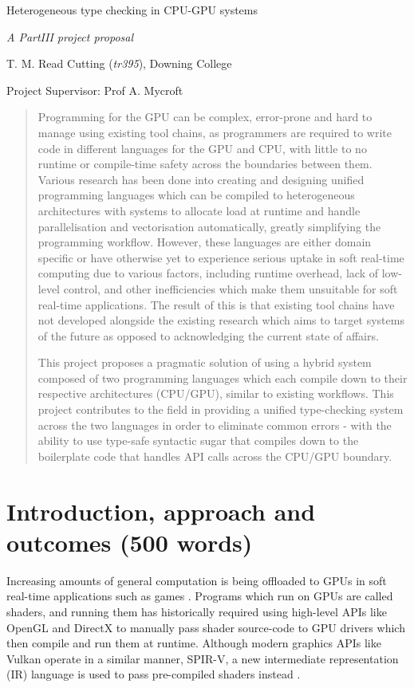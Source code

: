 \documentclass[11pt]{article}
\begin{document}
\centerline{\Large Heterogeneous type checking in CPU-GPU systems}
\vspace{2em}
\centerline{\Large \emph{A PartIII project proposal}}
\vspace{2em}
\centerline{\large T. M. Read Cutting (\emph{tr395}), Downing College}
\vspace{1em}
\centerline{\large Project Supervisor: Prof A. Mycroft}
\vspace{1em}

\begin{abstract}

Programming for the GPU can be complex, error-prone and hard to manage using
existing tool chains, as programmers are required to write code in different
languages for the GPU and CPU, with little to no runtime or compile-time safety
across the boundaries between them. Various research has been done into
creating and designing unified programming languages which can be compiled to
heterogeneous architectures with systems to allocate load at runtime and handle
parallelisation and vectorisation automatically, greatly simplifying the
programming workflow. However, these languages are either domain specific or
have otherwise yet to experience serious uptake in soft real-time computing due
to various factors, including runtime overhead, lack of low-level control, and
other inefficiencies which make them unsuitable for soft real-time
applications. The result of this is that existing tool chains have not
developed alongside the existing research which aims to target systems of the
future as opposed to acknowledging the current state of affairs.

This project proposes a pragmatic solution of using a hybrid system composed of
two programming languages which each compile down to their respective
architectures (CPU/GPU), similar to existing workflows. This project
contributes to the field in providing a unified type-checking system across the
two languages in order to eliminate common errors - with the ability to use
type-safe syntactic sugar that compiles down to the boilerplate code that
handles API calls across the CPU/GPU boundary.

\end{abstract}

\section{Introduction, approach and outcomes (500 words)}

Increasing amounts of general computation is being offloaded to GPUs in soft
real-time applications such as games \cite{GPGPUTechniques2012}. Programs which
run on GPUs are called shaders, and running them has historically required
using high-level APIs like OpenGL and DirectX to manually pass shader
source-code to GPU drivers which then compile and run them at runtime. Although
modern graphics APIs like Vulkan \cite{Vulkan} operate in a similar manner,
SPIR-V, a new intermediate representation (IR) language is used to pass
pre-compiled shaders instead \cite{SPIRV}.
\end{document}
